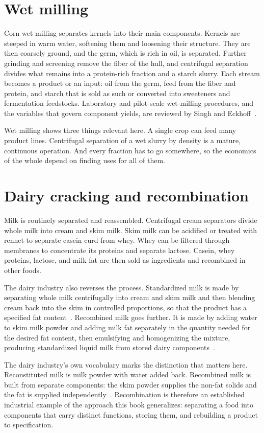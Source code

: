 \documentclass[11pt,openany]{book}
\theoremstyle{definition}
\begin{document}
\section{Wet milling}

Corn wet milling separates kernels into their main components. Kernels are steeped in warm water, softening them and loosening their structure. They are then coarsely ground, and the germ, which is rich in oil, is separated. Further grinding and screening remove the fiber of the hull, and centrifugal separation divides what remains into a protein-rich fraction and a starch slurry. Each stream becomes a product or an input: oil from the germ, feed from the fiber and protein, and starch that is sold as such or converted into sweeteners and fermentation feedstocks. Laboratory and pilot-scale wet-milling procedures, and the variables that govern component yields, are reviewed by Singh and Eckhoff~\cite{singh1996}.

Wet milling shows three things relevant here. A single crop can feed many product lines. Centrifugal separation of a wet slurry by density is a mature, continuous operation. And every fraction has to go somewhere, so the economics of the whole depend on finding uses for all of them.

\section{Dairy cracking and recombination}

Milk is routinely separated and reassembled. Centrifugal cream separators divide whole milk into cream and skim milk. Skim milk can be acidified or treated with rennet to separate casein curd from whey. Whey can be filtered through membranes to concentrate its proteins and separate lactose. Casein, whey proteins, lactose, and milk fat are then sold as ingredients and recombined in other foods.

The dairy industry also reverses the process. Standardized milk is made by separating whole milk centrifugally into cream and skim milk and then blending cream back into the skim in controlled proportions, so that the product has a specified fat content~\cite{tetrapak}. Recombined milk goes further. It is made by adding water to skim milk powder and adding milk fat separately in the quantity needed for the desired fat content, then emulsifying and homogenizing the mixture, producing standardized liquid milk from stored dairy components~\cite{tetrapak}.

The dairy industry's own vocabulary marks the distinction that matters here. Reconstituted milk is milk powder with water added back. Recombined milk is built from separate components: the skim powder supplies the non-fat solids and the fat is supplied independently~\cite{tetrapak}. Recombination is therefore an established industrial example of the approach this book generalizes: separating a food into components that carry distinct functions, storing them, and rebuilding a product to specification.
\end{document}
